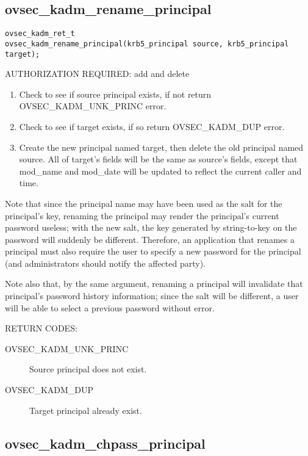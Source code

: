 \subsection{ovsec_kadm_rename_principal}

\begin{verbatim}
ovsec_kadm_ret_t
ovsec_kadm_rename_principal(krb5_principal source, krb5_principal target);
\end{verbatim}

AUTHORIZATION REQUIRED: add and delete

\begin{enumerate}
\item Check to see if source principal exists, if not return
OVSEC_KADM_UNK_PRINC error. 
\item Check to see if target exists, if so return OVSEC_KADM_DUP error.
\item Create the new principal named target, then delete the old
principal named source.  All of target's fields will be the same as
source's fields, except that mod_name and mod_date will be updated to
reflect the current caller and time.
\end{enumerate}

Note that since the principal name may have been used as the salt for
the principal's key, renaming the principal may render the principal's
current password useless; with the new salt, the key generated by
string-to-key on the password will suddenly be different.  Therefore,
an application that renames a principal must also require the user to
specify a new password for the principal (and administrators should
notify the affected party).

Note also that, by the same argument, renaming a principal will
invalidate that principal's password history information; since the
salt will be different, a user will be able to select a previous
password without error.

RETURN CODES: 

\begin{description}
\item[OVSEC_KADM_UNK_PRINC] Source principal does not exist.
\item[OVSEC_KADM_DUP] Target principal already exist.
\end{description}

\subsection{ovsec_kadm_chpass_principal}


